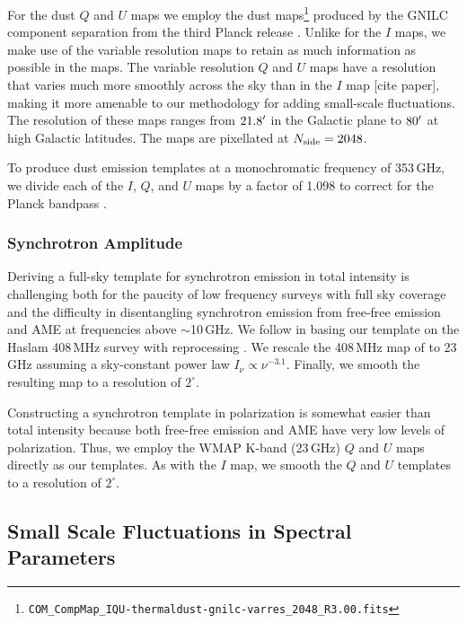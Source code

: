 \documentclass[twocolumn]{aastex631}
\begin{document}
For the dust $Q$ and $U$ maps we employ the dust maps\footnote{\texttt{COM\_CompMap\_IQU-thermaldust-gnilc-varres\_2048\_R3.00.fits}} produced by the GNILC component separation from the third Planck release \citep{planck2016-l04,planck2016-l11B}. Unlike for the $I$ maps, we make use of the variable resolution maps to retain as much information as possible in the maps. The variable resolution $Q$ and $U$ maps have a resolution that varies much more smoothly across the sky than in the $I$ map [cite paper], making it more amenable to our methodology for adding small-scale fluctuations. The resolution of these maps ranges from $21.8\mbox{$^\prime$}$ in the Galactic plane to $80\mbox{$^\prime$}$ at high Galactic latitudes. The maps are pixellated at $N_{\rm side} = 2048$. 

To produce dust emission templates at a monochromatic frequency of 353\,GHz, we divide each of the $I$, $Q$, and $U$ maps by a factor of 1.098 to correct for the Planck bandpass \citep[][Table~2]{planck2016-l11A}.

\subsubsection{Synchrotron Amplitude}
Deriving a full-sky template for synchrotron emission in total intensity is challenging both for the paucity of low frequency surveys with full sky coverage and the difficulty in disentangling synchrotron emission from free-free emission and AME at frequencies above $\sim$10\,GHz. We follow \citet{Thorne:2017} in basing our template on the Haslam 408\,MHz survey with reprocessing \citep{Remazeilles:2015}. We rescale the 408\,MHz map of \cite{Remazeilles:2015} to 23\,GHz assuming a sky-constant power law $I_\nu \propto \nu^{-3.1}$. Finally, we smooth the resulting map to a resolution of $2^\circ$.

Constructing a synchrotron template in polarization is somewhat easier than total intensity because both free-free emission and AME have very low levels of polarization. Thus, we employ the WMAP K-band (23\,GHz) $Q$ and $U$ maps directly as our templates. As with the $I$ map, we smooth the $Q$ and $U$ templates to a resolution of $2^\circ$.


\subsection{Small Scale Fluctuations in Spectral Parameters}
\end{document}
